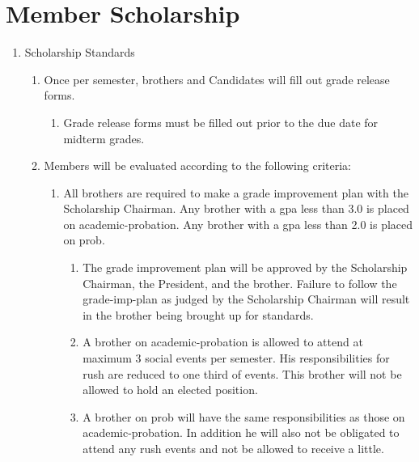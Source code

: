 \section{Member Scholarship}
	\label{member-schol-stds}
	\begin{enumerate}

	\item Scholarship Standards
		\begin{enumerate}
			\item Once per semester, brothers and Candidates will fill out grade release forms.
			\begin{enumerate}
				\item Grade release forms must be filled out prior to the due date for midterm grades.
			\end{enumerate}

			\item Members will be evaluated according to the following criteria:\label{academic-probation}	
			\begin{enumerate}
				\item All brothers are required to make a  grade improvement plan with the Scholarship Chairman. Any brother with a  \gls{gpa} less than 3.0 is placed on \gls{academic-probation}. Any brother with a \gls{gpa} less than 2.0 is placed on \gls{prob}.
				
				\begin{enumerate}
					\item The grade improvement plan will be approved by the Scholarship Chairman, the President, and the brother. Failure to follow the \gls{grade-imp-plan} as judged by the Scholarship Chairman will result in the brother being brought up for standards.
					\label{academic-watch} 
					
					\item A brother on \gls{academic-probation} is allowed to attend at maximum 3 social events per semester. His responsibilities for rush are reduced to one third of events. This brother will not be allowed to hold an elected position. \label{officer-eligibility}
					\label{academic-probation} 
					
					\item A brother on \gls{prob} will have the same responsibilities as those on \gls{academic-probation}.  In addition he will also not be obligated to attend any rush events and not be allowed to receive a little.
				\end{enumerate}


\end{enumerate}
\end{enumerate}
\end{enumerate}
